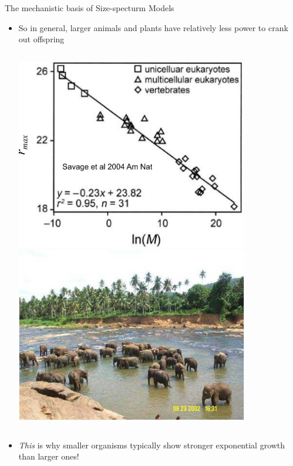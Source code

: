 \documentclass[xcolor={usenames,x11names},compress]{beamer}
\renewcommand{\(}{\begin{columns}}
\renewcommand{\)}{\end{columns}}
\newcommand{\<}[1]{\begin{column}{#1}}
\renewcommand{\>}{\end{column}}
\begin{document}
\begin{frame}{The mechanistic basis of Size-specturm Models}

  \begin{itemize} \itemsep10pt
    \item So in general, larger animals and plants have relatively less power to crank out offspring

  \begin{columns}[c]
    \column{2.5in}\centering
    \centering
    \includegraphics[width=0.8\textwidth]{r_max.pdf}
    \column{2.5in}\centering
    \pause
    \includegraphics[width=0.8\textwidth]{Elephants.jpg}
  \end{columns}

    \item {\it This} is why smaller organisms typically show stronger exponential growth than larger ones!
  \end{itemize}

\end{frame}
\end{document}
